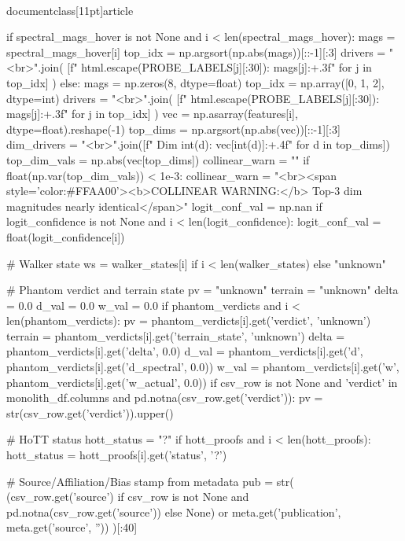 \\documentclass[11pt]{article}
\begin{document}
\begin{CodeBlock}
{{{{{        if spectral_mags_hover is not None and i < len(spectral_mags_hover):
            mags = spectral_mags_hover[i]
            top_idx = np.argsort(np.abs(mags))[::-1][:3]
            drivers = "<br>".join(
                [f"  {html.escape(PROBE_LABELS[j][:30])}: {mags[j]:+.3f}" for j in top_idx]
            )
        else:
            mags = np.zeros(8, dtype=float)
            top_idx = np.array([0, 1, 2], dtype=int)
            drivers = "<br>".join(
                [f"  {html.escape(PROBE_LABELS[j][:30])}: {mags[j]:+.3f}" for j in top_idx]
            )
        vec = np.asarray(features[i], dtype=float).reshape(-1)
        top_dims = np.argsort(np.abs(vec))[::-1][:3]
        dim_drivers = "<br>".join([f"  Dim {int(d)}: {vec[int(d)]:+.4f}" for d in top_dims])
        top_dim_vals = np.abs(vec[top_dims])
        collinear_warn = ""
        if float(np.var(top_dim_vals)) < 1e-3:
            collinear_warn = "<br><span style='color:#FFAA00'><b>COLLINEAR WARNING:</b> Top-3 dim magnitudes nearly identical</span>"
        logit_conf_val = np.nan
        if logit_confidence is not None and i < len(logit_confidence):
            logit_conf_val = float(logit_confidence[i])

        # Walker state
        ws = walker_states[i] if i < len(walker_states) else "unknown"

        # Phantom verdict and terrain state
        pv = "unknown"
        terrain = "unknown"
        delta = 0.0
        d_val = 0.0
        w_val = 0.0
        if phantom_verdicts and i < len(phantom_verdicts):
            pv = phantom_verdicts[i].get('verdict', 'unknown')
            terrain = phantom_verdicts[i].get('terrain_state', 'unknown')
            delta = phantom_verdicts[i].get('delta', 0.0)
            d_val = phantom_verdicts[i].get('d', phantom_verdicts[i].get('d_spectral', 0.0))
            w_val = phantom_verdicts[i].get('w', phantom_verdicts[i].get('w_actual', 0.0))
        if csv_row is not None and 'verdict' in monolith_df.columns and pd.notna(csv_row.get('verdict')):
            pv = str(csv_row.get('verdict')).upper()

        # HoTT status
        hott_status = "?"
        if hott_proofs and i < len(hott_proofs):
            hott_status = hott_proofs[i].get('status', '?')

        # Source/Affiliation/Bias stamp from metadata
        pub = str(
            (csv_row.get('source') if csv_row is not None and pd.notna(csv_row.get('source')) else None)
            or meta.get('publication', meta.get('source', ''))
        )[:40]
        
}}}}}
\end{CodeBlock}
\end{document}
